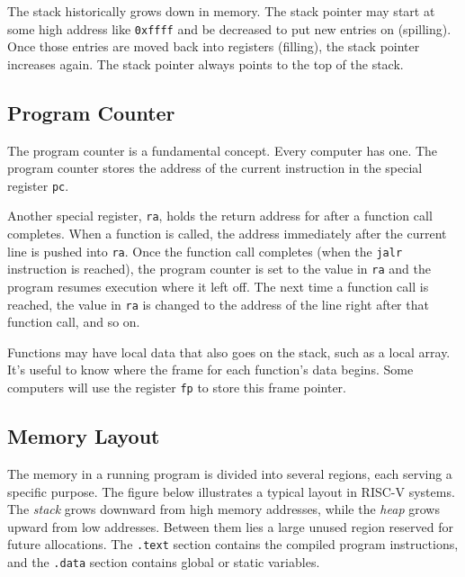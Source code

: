 The stack historically grows down in memory. The stack pointer may start
at some high address like \texttt{0xffff} and be decreased to put new entries
on (spilling). Once those entries are moved back into registers (filling), the stack
pointer increases again. The stack pointer always points to the top of the
stack.

\subsection{Program Counter}
The program counter is a fundamental concept. Every computer has
one. The program counter stores the address of the current instruction in
the special register \texttt{pc}.

Another special register, \texttt{ra}, holds the return address for
after a function call completes. When a function is called, the address
immediately after the current line is pushed into \texttt{ra}. Once the
function call completes (when the \texttt{jalr} instruction is reached),
the program counter is set to the value in \texttt{ra} and the program
resumes execution where it left off. The next time a function call is reached,
the value in \texttt{ra} is changed to the address of the line right
after that function call, and so on.

Functions may have local data that also goes on the stack, such as a local array.
It's useful to know where the frame for each function's data begins.
Some computers will use the register \texttt{fp} to store this frame pointer.

\subsection{Memory Layout}

The memory in a running program is divided into several regions, each
serving a specific purpose. The figure below illustrates a typical layout
in RISC-V systems. The \emph{stack} grows downward from high memory addresses,
while the \emph{heap} grows upward from low addresses. Between them lies a large
unused region reserved for future allocations. The \texttt{.text} section
contains the compiled program instructions, and the \texttt{.data} section
contains global or static variables.

